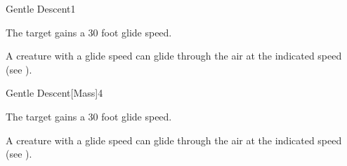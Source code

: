 \begin{spellsection}{Gentle Descent}{1}
\begin{spellheader}
\end{spellheader}
\begin{spellcontent}
    \begin{spelltargetinginfo}
    \end{spelltargetinginfo}
    \begin{spelleffects}
        \spelleffect The target gains a 30 foot glide speed.
        \spelldur \durshort
    \end{spelleffects}
\end{spellcontent}
\begin{spellfooter}
    \spellnotes A creature with a glide speed can glide through the air at the indicated speed (see ).
\end{spellfooter}
\end{spellsection}

\begin{spellsection}{Gentle Descent}[Mass]{4}
\begin{spellheader}
\end{spellheader}
\begin{spellcontent}
    \begin{spelltargetinginfo}
    \end{spelltargetinginfo}
    \begin{spelleffects}
        \spelleffect The target gains a 30 foot glide speed.
        \spelldur \durshort
    \end{spelleffects}
\end{spellcontent}
\begin{spellfooter}
    \spellnotes A creature with a glide speed can glide through the air at the indicated speed (see ).
\end{spellfooter}
\end{spellsection}

